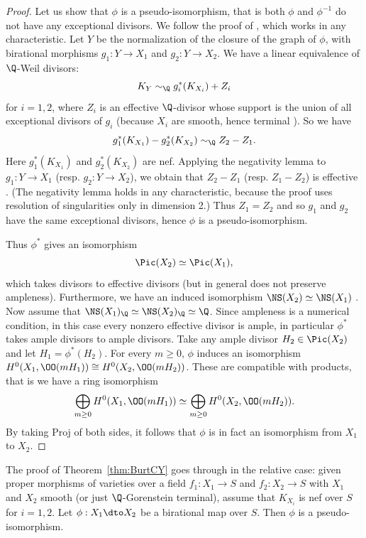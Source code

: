 \begin{proof}
Let us show that $\phi$ is a pseudo-isomorphism, that is both
$\phi$
and $\phi^{-1}$ do not have any exceptional divisors.
We follow the proof of \cite[Corollary 3.54]{KollarMori}, which works
in any characteristic. Let $Y$ be the normalization of the closure
of the graph of $\phi$,
with birational morphisms $g_1\colon Y\to X_1$
and $g_2\colon Y\to X_2$.
We have a linear equivalence of $\Q$-Weil divisors:
$$K_Y \sim_{\Q} g_i^*(K_{X_i})+Z_i$$
for $i=1,2$, where $Z_i$ is an effective $\Q$-divisor
whose support is the union
of all exceptional divisors of $g_i$ (because $X_i$ are smooth, hence terminal \cite[Claim 2.10.4]{KollarSingMMP}).
So we have
$$g_1^*(K_{X_1})-g_2^*(K_{X_2})\sim_{\Q} Z_2-Z_1.$$
Here $g_1^*(K_{X_1})$ and $g_2^*(K_{X_2})$ are nef.
Applying the negativity lemma to $g_1 : Y \to X_1$
(resp. $g_2 : Y\to X_2$), we obtain that $Z_2-Z_1$
(resp. $Z_1-Z_2$) is effective \cite[Lemma 3.39]{KollarMori}.
(The negativity lemma holds in any characteristic,
because the proof uses resolution
of singularities only in dimension 2.)
Thus $Z_1=Z_2$ and so $g_1$
and $g_2$ have the same exceptional divisors, hence $\phi$ is a pseudo-isomorphism.


Thus $\phi^*$
gives an isomorphism
\[
\Pic(X_2) \simeq \Pic(X_1),
\]
which takes divisors
to effective divisors (but in general does not preserve ampleness).
Furthermore,
we have
an induced
isomorphism $\NS(X_2) \simeq \NS(X_1)$ \cite[Example 19.1.6]{Fulton}.
Now assume that
$\NS(X_1)_\Q \simeq \NS(X_2)_\Q \simeq \Q$.
Since ampleness is a numerical condition, in this case
every nonzero
effective divisor is ample, in particular
$\phi^*$
takes ample divisors to
ample divisors.
Take any ample
divisor
$H_2 \in \Pic(X_2)$
and let $H_1 = \phi^*(H_2)$.
For
every $m \ge 0$,
$\phi$ induces
an isomorphism $H^0(X_1,\OO(mH_1)) \cong H^0(X_2,\OO(mH_2))$.
These are compatible with products,
that is we have a ring isomorphism
\[
\bigoplus_{m\geq 0} H^0(X_1,\OO(mH_1)) \simeq
\bigoplus_{m\geq 0} H^0(X_2,\OO(mH_2)).
\]
By taking Proj of both sides, it follows that $\phi$ is in fact
an isomorphism from $X_1$ to $X_2$.
\end{proof}

\begin{remark}
\notready\label{rem:burt}
The proof of Theorem~\ref{thm:BurtCY}
goes through in the relative case: given proper morphisms of varieties over a field $f_1: X_1 \to S$ and $f_2: X_2 \to S$
with $X_1$ and $X_2$ smooth (or just $\Q$-Gorenstein
terminal),
assume
that
$K_{X_i}$ is nef over $S$ for $i = 1, 2$.
Let $\phi: X_1 \dto X_2$
be a birational map over $S$.
Then $\phi$ is a pseudo-isomorphism.
\end{remark}



